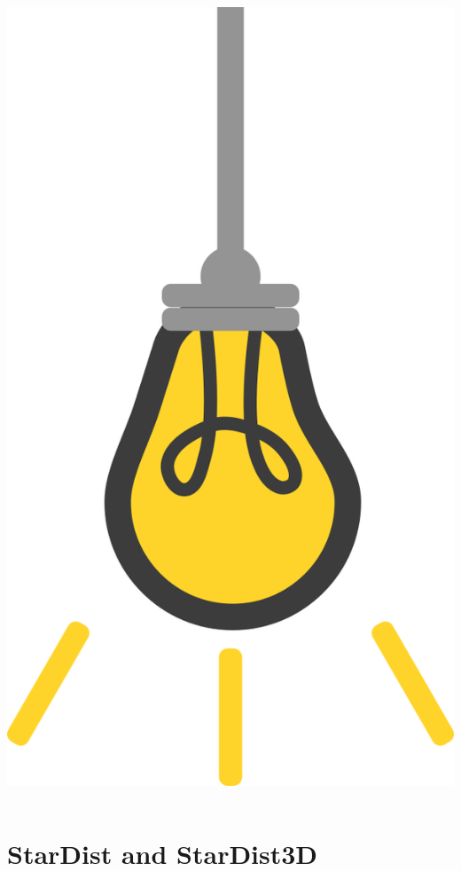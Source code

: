 \documentclass[9pt, aspectratio=169]{beamer}
\begin{document}
\begin{frame}
\begin{columns}
\begin{column}{0.2\textwidth}
            \includegraphics[angle=-30, origin=tr, width=1.5\textwidth]{lightbulb.png}
        \end{column}
    \end{columns}
\end{frame}

\section{StarDist and StarDist3D}
\end{document}
